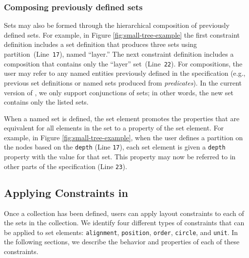 \subsubsection{Composing previously defined sets}
Sets may also be formed through the hierarchical
composition of previously defined sets. For example, in Figure
\ref{fig:small-tree-example} the first constraint definition includes a 
set definition that produces three sets using partition~(Line~\texttt{17}),
named ``layer.'' The next constraint definition includes a composition 
that contains only the ``layer'' set~(Line~\texttt{22}). For compositions, the user may
refer to any named entities previously defined in the specification (e.g.,
previous set definitions or named sets produced from \emph{predicates}).
In the current version of \projectname, we only support conjunctions of
sets; in other words, the new set contains only the listed sets.

When a named set is defined, the set element promotes the properties that
are equivalent for all elements in the set to a property of the set
element. For example, in Figure \ref{fig:small-tree-example}, when the user
defines a partition on the nodes based on the \texttt{depth} (Line
\texttt{17}), each set element is given a \texttt{depth} property with
the value for that set. This property may now be referred to in other parts
of the \projectname specification (Line \texttt{23}).


\subsection{Applying Constraints in \projectname}

\label{sec:constraints}
Once a collection has been defined, users can apply layout constraints to
each of the sets in the collection. We identify four different types of
constraints that can be applied to set elements: \texttt{alignment},
\texttt{position}, \texttt{order}, \texttt{circle}, and \texttt{unit}. In
the following sections, we describe the behavior and properties of each of
these constraints.


